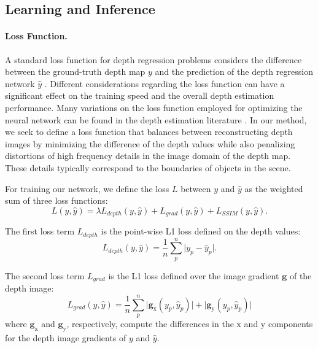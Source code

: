 \documentclass[10pt,twocolumn,letterpaper]{article}
\begin{document}
\subsection{Learning and Inference}


\paragraph{Loss Function.} A standard loss function for depth regression problems considers the difference between the ground-truth depth map $y$ and the prediction of the depth regression network $\hat{y}$ \cite{Eigen2014}. Different considerations regarding the loss function can have a significant effect on the training speed and the overall depth estimation performance. Many variations on the loss function employed for optimizing the neural network can be found in the depth estimation literature \cite{Eigen2014,Laina2016,Ummenhofer2017,Fu2018DeepOR}. In our method, we seek to define a loss function that balances between reconstructing depth images by minimizing the difference of the depth values while also penalizing distortions of high frequency details in the image domain of the depth map. These details typically correspond to the boundaries of objects in the scene.

For training our network, we define the loss $L$ between $y$ and $\hat{y}$ as the weighted sum of three loss functions: 
\begin{equation}
L(y,\hat{y}) = \lambda L_{depth}(y,\hat{y}) + L_{grad}(y,\hat{y}) + L_{SSIM}(y,\hat{y}).
\end{equation}

The first loss term $L_{depth}$ is the point-wise L1 loss defined on the depth values:
\begin{equation}
L_{depth}(y,\hat{y}) = \frac{1}{n} \sum_{p}^{n} \lvert y_p -\hat{y}_p \rvert.
\end{equation}

The second loss term $L_{grad}$ is the L1 loss defined over the image gradient $\boldsymbol{g}$ of the depth image:
\begin{equation}
L_{grad}(y,\hat{y}) = \frac{1}{n} \sum_{p}^{n} \lvert \boldsymbol{g_\mathrm{x}}(y_p,\hat{y}_p) \rvert +                         \lvert \boldsymbol{g_\mathrm{y}}(y_p,\hat{y}_p) \rvert
\end{equation}
where $\boldsymbol{g_\mathrm{x}}$ and $\boldsymbol{g_\mathrm{y}}$, respectively, compute the differences in the $\mathrm{x}$ and $\mathrm{y}$ components for the depth image gradients of $y$ and $\hat{y}$. 
\end{document}
